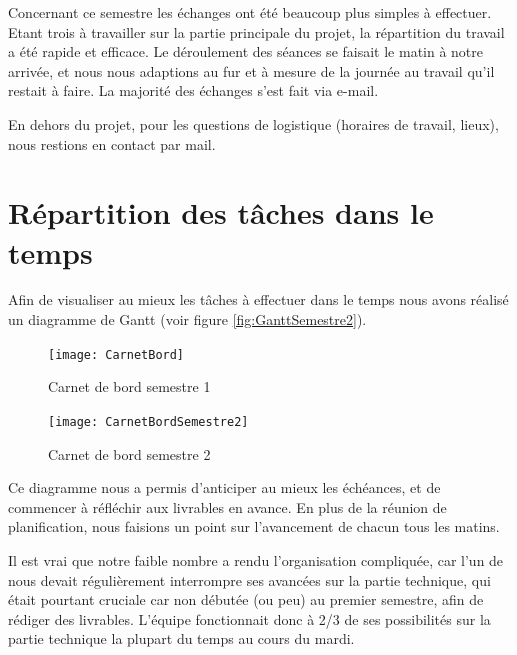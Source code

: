 Concernant ce semestre les échanges ont été beaucoup plus simples à effectuer. Etant trois à travailler sur la partie principale du projet, la répartition du travail a été rapide et efficace. Le déroulement des séances se faisait le matin à notre arrivée, et nous nous adaptions au fur et à mesure de la journée au travail qu’il restait à faire.
La majorité des échanges s'est fait via e-mail.
 
En dehors du projet, pour les questions de logistique (horaires de travail, lieux), nous restions en contact par mail. 

\section{Répartition des tâches dans le temps}

Afin de visualiser au mieux les tâches à effectuer dans le temps nous avons réalisé un diagramme de Gantt (voir figure \ref{fig:GanttSemestre2}).
 
\begin{figure}[H]
  \centering
  \texttt{[image: CarnetBord]}
  \caption{Carnet de bord semestre 1}
  \label{fig:CarnetBord}
\end{figure}

\begin{figure}[H]
  \centering
  \texttt{[image: CarnetBordSemestre2]}
  \caption{Carnet de bord semestre 2}
  \label{fig:CarnetBordS2}
\end{figure}
 
Ce diagramme nous a permis d’anticiper au mieux les échéances, et de commencer à réfléchir aux livrables en avance. En plus de la réunion de planification, nous faisions un point sur l’avancement de chacun tous les matins.

Il est vrai que notre faible nombre a rendu l’organisation compliquée, car l’un de nous devait régulièrement interrompre ses avancées sur la partie technique, qui était pourtant cruciale car non débutée (ou peu) au premier semestre, afin de rédiger des livrables. L’équipe fonctionnait donc à 2/3 de ses possibilités sur la partie technique la plupart du temps au cours du mardi.
 
